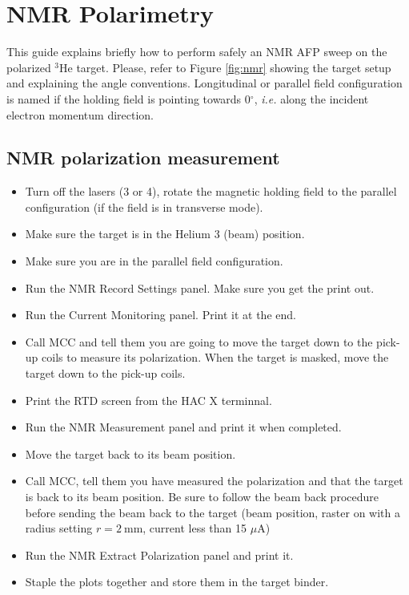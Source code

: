 \section{NMR Polarimetry}
\label{sec:nmr}

This guide explains briefly how to perform safely an NMR AFP sweep on the
polarized $^{3}$He target. Please, refer to Figure \ref{fig:nmr}  
showing the target setup and explaining the angle conventions. Longitudinal 
or parallel field configuration is named if the holding field is pointing 
towards 0$^{\circ}$, {\it i.e.\/} 
along the incident electron momentum direction. 


\subsection{NMR polarization measurement}

\begin{itemize}
\item{Turn off the lasers (3 or 4), rotate the magnetic holding
field to the parallel configuration (if the field is in transverse mode).}
\item{Make sure the target is in the Helium 3 (beam) position.}
\item{Make sure you are in the parallel field configuration.}
\item{Run the NMR Record Settings panel. Make sure you get the print out.}
\item{Run the Current Monitoring panel. Print it at the end.}
\item{Call MCC and tell them you are going to move the target down to 
the pick-up coils to measure its polarization. When the target is masked, 
move the target down to the pick-up coils.}
\item{Print the RTD screen from the HAC X terminnal.}
\item{Run the NMR Measurement panel and print it when completed.}
\item{Move the target back to its beam position.}
\item{Call MCC, tell them you have measured the polarization 
and that the target is back to its beam position. 
Be sure to follow the beam back procedure before sending 
the beam back to the target (beam position, raster on with 
a radius setting  $r=2\ $mm, current less than 15 $\mu$A)}
\item{Run the NMR Extract Polarization panel and print it.}
\item{Staple the plots together and store them in the target binder.}
\end{itemize}

